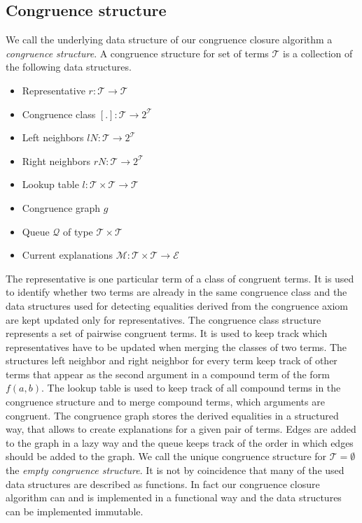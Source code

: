 \subsection*{Congruence structure}

We call the underlying data structure of our congruence closure algorithm a \emph{congruence structure}.
A congruence structure for set of terms $\mathcal{T}$ is a collection of the following data structures.

\begin{itemize}
	\item Representative $r: \mathcal{T} \rightarrow \mathcal{T}$
	\item Congruence class $[.]: \mathcal{T} \rightarrow 2^\mathcal{T}$
	\item Left neighbors $lN: \mathcal{T} \rightarrow 2^\mathcal{T}$
	\item Right neighbors $rN: \mathcal{T} \rightarrow 2^\mathcal{T}$
	\item Lookup table $l: \mathcal{T} \times \mathcal{T} \rightarrow \mathcal{T}$
	\item Congruence graph $g$
	\item Queue $\mathcal{Q}$ of type $\mathcal{T} \times \mathcal{T}$
	\item Current explanations $\mathcal{M}: \mathcal{T} \times \mathcal{T} \rightarrow \mathcal{E}$
\end{itemize}

The representative is one particular term of a class of congruent terms.
It is used to identify whether two terms are already in the same congruence class and the data structures used for detecting equalities derived from the congruence axiom are kept updated only for representatives.
The congruence class structure represents a set of pairwise congruent terms.
It is used to keep track which representatives have to be updated when merging the classes of two terms.
The structures left neighbor and right neighbor for every term keep track of other terms that appear as the second argument in a compound term of the form $f(a,b)$.
The lookup table is used to keep track of all compound terms in the congruence structure and to merge compound terms, which arguments are congruent.
The congruence graph stores the derived equalities in a structured way, that allows to create explanations for a given pair of terms.
Edges are added to the graph in a lazy way and the queue keeps track of the order in which edges should be added to the graph.
We call the unique congruence structure for $\mathcal{T} = \emptyset$ the \emph{empty congruence structure}.
It is not by coincidence that many of the used data structures are described as functions.
In fact our congruence closure algorithm can and is implemented in a functional way and the data structures can be implemented immutable.

